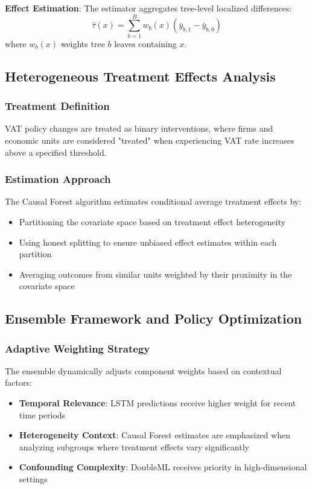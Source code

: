\textbf{Effect Estimation}: The estimator aggregates tree-level localized differences:
\begin{equation}
  \hat{\tau}(x) = \sum_{b=1}^B w_b(x) \left( \bar{y}_{b,1} - \bar{y}_{b,0} \right)
\end{equation}
where $w_b(x)$ weights tree $b$ leaves containing $x$.

\subsection{Heterogeneous Treatment Effects Analysis}\label{subsec:heterogeneous}

\subsubsection{Treatment Definition}
VAT policy changes are treated as binary interventions, where firms and economic units are considered "treated" when experiencing VAT rate increases above a specified threshold.

\subsubsection{Estimation Approach}
The Causal Forest algorithm estimates conditional average treatment effects by:
\begin{itemize}
    \item Partitioning the covariate space based on treatment effect heterogeneity
    \item Using honest splitting to ensure unbiased effect estimates within each partition
    \item Averaging outcomes from similar units weighted by their proximity in the covariate space
\end{itemize}

\subsection{Ensemble Framework and Policy Optimization}\label{subsec:hybrid}

\subsubsection{Adaptive Weighting Strategy}
The ensemble dynamically adjusts component weights based on contextual factors:
\begin{itemize}
    \item \textbf{Temporal Relevance}: LSTM predictions receive higher weight for recent time periods
    \item \textbf{Heterogeneity Context}: Causal Forest estimates are emphasized when analyzing subgroups where treatment effects vary significantly
    \item \textbf{Confounding Complexity}: DoubleML receives priority in high-dimensional settings
\end{itemize}

